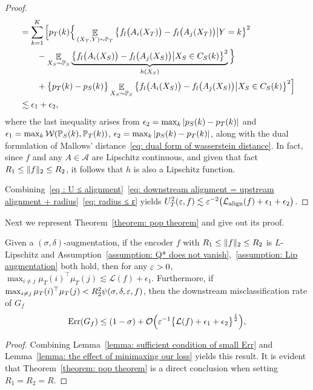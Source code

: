 \begin{proof}
\begin{align}
&= \sum_{k=1}^{K}\Big[p_T(k)\Big\{\mathop{\E}_{(X_T, Y)\sim \P_T}\big\{f_l\big(A_i(X_T)\big) - f_l\big(A_j(X_T)\big)\big\vert Y = k\big\}^2 \nonumber \\ 
&\qquad - \mathop{\E}_{X_S \sim \P_S}\underbrace{\big\{f_l\big(A_i(X_S)\big) - f_l\big(A_j(X_S)\big)\big\vert X_S \in C_S(k)\big\}^2}_{h(X_S)}\Big\} \nonumber\\
&\qquad + \big\{p_T(k) - p_S(k)\big\}\mathop{\E}_{X_S\sim \P_S}\big\{f_l\big(A_i(X_S)\big) - f_l\big(A_j(X_S)\big)\big\vert X_S \in C_S(k)\big\}^2\Big] \nonumber \\
&\lesssim \epsilon_1 + \epsilon_2,
\end{align}
where the last inequality arises from $\epsilon_2 = \max_k\abs{p_S(k) - p_T(k)}$ and $\epsilon_1 = \max_k\mathcal{W}(\P_S(k), \P_T(k))$, $\epsilon_2 = \max_k\abs{p_S(k) - p_T(k)}$, along with the dual formulation of Mallows' distance~\eqref{eq: dual form of wasserstein distance}. In fact, since $f$ and any $A \in \mathcal{A}$ are Lipschitz continuous, and given that fact $R_1\leq \norm{f}_2 \leq R_2$, it follows that $h$ is also a Lipschitz function.

Combining~\eqref{eq : U ≤ alignment}~\eqref{eq: downstream alignment = upstream alignment + radius}~\eqref{eq: radius ≤ ɛ} yields $U_T^2(\eps, f) \lesssim \eps^{-2}\big(\mathcal{L}_{\mathrm{align}}(f) + \epsilon_1 + \epsilon_2\big)$.
\end{proof}
Next we represent Theorem~\ref{theorem: pop theorem} and give out its proof.
\begin{theorem} \label{theorem: general version of the pop theorem}
Given a $(\sigma, \delta)$-augmentation, if the encoder $f$ with $R_1 \leq \norm{f}_2 \leq R_2$ is $L$-Lipschitz and Assumption~\ref{assumption: Q* does not vanish},~\ref{assumption: Lip augmentation} both hold, then for any $\eps > 0$, $\max_{i \neq j}\mu_T(i)^\top\mu_T(j) \lesssim \mathcal{L}(f) + \epsilon_1$. Furthermore, if $\max_{i\neq j}\mu_T(i)^\top\mu_T(j) < R_2^2\psi(\sigma, \delta, \eps, f)$, then the downstream misclassification rate of $G_f$
\begin{align*}
\mathrm{Err}(G_f) \leq (1 - \sigma) + \mathcal{O}\Big(\eps^{-1}\big\{\mathcal{L}(f) + \epsilon_1 + \epsilon_2\big\}^{\frac{1}{2}}\Big),
\end{align*}
\end{theorem}
\begin{proof}
    Combining Lemma~\ref{lemma: sufficient condition of small Err} and Lemma~\ref{lemma: the effect of minimaxing our loss} yields this result. It is evident that Theorem~\ref{theorem: pop theorem} is a direct conclusion when setting $R_1 = R_2 = R$.
\end{proof}